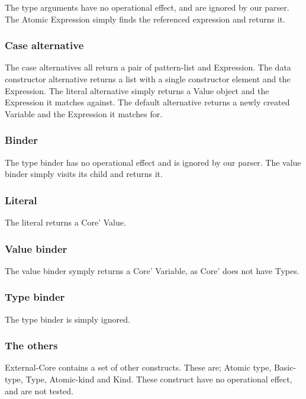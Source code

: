 The type arguments have no operational effect, and are ignored by our parser.
The Atomic Expression simply finds the referenced expression and returns it.

\subsubsection{Case alternative}

The case alternatives all return a pair of pattern-list and Expression. The
data constructor alternative returns a list with a single constructor element and
the Expression. The literal alternative simply returns a Value object and the 
Expression it matches against. The default alternative returns a newly created
Variable and the Expression it matches for.

\subsubsection{Binder}

The type binder has no operational effect and is ignored by our parser. The 
value binder simply visits its child and returns it.
\subsubsection{Literal}

The literal returns a Core' Value.


\subsubsection{Value binder}

The value binder symply returns a Core' Variable, as Core' does not have Types.


\subsubsection{Type binder}

The type binder is simply ignored.

\subsubsection{The others}

External-Core contains a set of other constructs. These are;
Atomic type, Basic-type, Type, Atomic-kind and Kind. These construct
have no operational effect, and are not tested.

